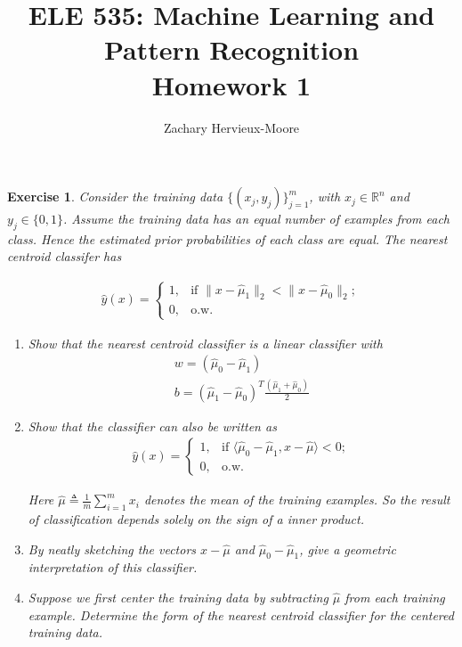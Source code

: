 \documentclass[12pt]{article}
\title{ELE 535: Machine Learning and Pattern Recognition \\ Homework 1}
\author{Zachary Hervieux-Moore}
\date{\displaydate{date}}
\theoremstyle{colon}
\newtheorem{exercise}{Exercise}
\begin{document}
\maketitle

\clearpage

\begin{exercise}
  Consider the training data $\{(x_j, y_j)\}_{j=1}^m$, with $x_j \in \mathbb{R}^n$ and $y_j \in \{0,1\}$. Assume the training data has an equal number of examples from each class. Hence the estimated prior probabilities of each class are equal. The nearest centroid classifer has

  \begin{gather*}
    \hat{y}(x) = \begin{cases} 
      1, & \text{if } \lVert x - \hat{\mu}_1 \rVert_2 < \lVert x - \hat{\mu}_0 \rVert_2; \\
      0, & \text{o.w.}
    \end{cases}
  \end{gather*}

  \begin{enumerate}[label=\alph*)]
    \item Show that the nearest centroid classifier is a linear classifier with
      \begin{gather*}
        w = (\hat{\mu}_0 - \hat{\mu}_1) \\
        b = (\hat{\mu}_1 - \hat{\mu}_0)^T \frac{(\hat{\mu}_1 + \hat{\mu}_0)}{2}
      \end{gather*}

    \item Show that the classifier can also be written as
      \begin{gather*}
        \hat{y}(x) = \begin{cases} 
          1, & \text{if } \langle \hat{\mu}_0 - \hat{\mu}_1, x - \hat{\mu} \rangle < 0; \\
          0, & \text{o.w.}
        \end{cases}
      \end{gather*}

      Here $\hat{\mu} \triangleq \frac{1}{m} \sum_{i=1}^m x_i$ denotes the mean of the training examples. So the result of classification depends solely on the sign of a inner product.

    \item By neatly sketching the vectors $x - \hat{\mu}$ and $\hat{\mu}_0 - \hat{\mu}_1$, give a geometric interpretation of this classifier.

    \item Suppose we first center the training data by subtracting $\hat{\mu}$ from each training example. Determine the form of the nearest centroid classifier for the centered training data.
  \end{enumerate}
\end{exercise}
\end{document}
